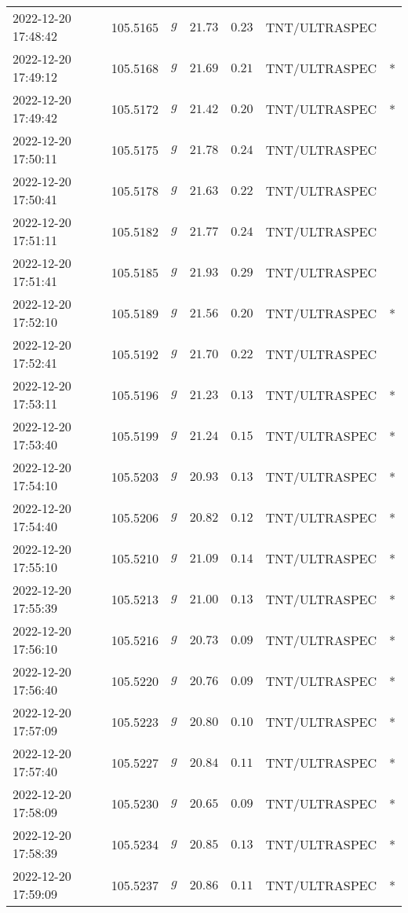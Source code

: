\documentclass{nature_plusfigure}
\begin{document}
\begin{supplement}
\begin{center}
\begin{longtable}{lllllll}
2022-12-20 17:48:42 & 105.5165 & $g$ & $21.73$ & $0.23$ & TNT/ULTRASPEC &  \\ 
2022-12-20 17:49:12 & 105.5168 & $g$ & $21.69$ & $0.21$ & TNT/ULTRASPEC & * \\ 
2022-12-20 17:49:42 & 105.5172 & $g$ & $21.42$ & $0.20$ & TNT/ULTRASPEC & * \\ 
2022-12-20 17:50:11 & 105.5175 & $g$ & $21.78$ & $0.24$ & TNT/ULTRASPEC &  \\ 
2022-12-20 17:50:41 & 105.5178 & $g$ & $21.63$ & $0.22$ & TNT/ULTRASPEC &  \\ 
2022-12-20 17:51:11 & 105.5182 & $g$ & $21.77$ & $0.24$ & TNT/ULTRASPEC &  \\ 
2022-12-20 17:51:41 & 105.5185 & $g$ & $21.93$ & $0.29$ & TNT/ULTRASPEC &  \\ 
2022-12-20 17:52:10 & 105.5189 & $g$ & $21.56$ & $0.20$ & TNT/ULTRASPEC & * \\ 
2022-12-20 17:52:41 & 105.5192 & $g$ & $21.70$ & $0.22$ & TNT/ULTRASPEC &  \\ 
2022-12-20 17:53:11 & 105.5196 & $g$ & $21.23$ & $0.13$ & TNT/ULTRASPEC & * \\ 
2022-12-20 17:53:40 & 105.5199 & $g$ & $21.24$ & $0.15$ & TNT/ULTRASPEC & * \\ 
2022-12-20 17:54:10 & 105.5203 & $g$ & $20.93$ & $0.13$ & TNT/ULTRASPEC & * \\ 
2022-12-20 17:54:40 & 105.5206 & $g$ & $20.82$ & $0.12$ & TNT/ULTRASPEC & * \\ 
2022-12-20 17:55:10 & 105.5210 & $g$ & $21.09$ & $0.14$ & TNT/ULTRASPEC & * \\ 
2022-12-20 17:55:39 & 105.5213 & $g$ & $21.00$ & $0.13$ & TNT/ULTRASPEC & * \\ 
2022-12-20 17:56:10 & 105.5216 & $g$ & $20.73$ & $0.09$ & TNT/ULTRASPEC & * \\ 
2022-12-20 17:56:40 & 105.5220 & $g$ & $20.76$ & $0.09$ & TNT/ULTRASPEC & * \\ 
2022-12-20 17:57:09 & 105.5223 & $g$ & $20.80$ & $0.10$ & TNT/ULTRASPEC & * \\ 
2022-12-20 17:57:40 & 105.5227 & $g$ & $20.84$ & $0.11$ & TNT/ULTRASPEC & * \\ 
2022-12-20 17:58:09 & 105.5230 & $g$ & $20.65$ & $0.09$ & TNT/ULTRASPEC & * \\ 
2022-12-20 17:58:39 & 105.5234 & $g$ & $20.85$ & $0.13$ & TNT/ULTRASPEC & * \\ 
2022-12-20 17:59:09 & 105.5237 & $g$ & $20.86$ & $0.11$ & TNT/ULTRASPEC & * \\ 

\end{longtable}
\end{center}
\end{supplement}
\end{document}
